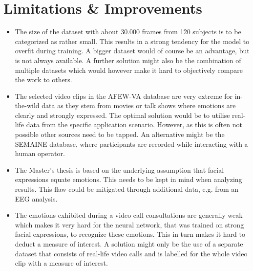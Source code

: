 \section{Limitations \& Improvements}
\begin{itemize}
    \item The size of the dataset with about 30.000 frames from 120 subjects is to be categorized as rather small. This results in a strong tendency for the model to overfit during training. A bigger dataset would of course be an advantage, but is not always available. A further solution might also be the combination of multiple datasets which would however make it hard to objectively compare the work to others.
    \item The selected video clips in the AFEW-VA database are very extreme for in-the-wild data as they stem from movies or talk shows where emotions are clearly and strongly expressed. The optimal solution would be to utilise real-life data from the specific application scenario. However, as this is often not possible other sources need to be tapped. An alternative might be the SEMAINE database, where participants are recorded while interacting with a human operator.
    \item The Master's thesis is based on the underlying assumption that facial expressions equate emotions. This needs to be kept in mind when analyzing results. This flaw could be mitigated through additional data, e.g. from an EEG analysis.
    \item The emotions exhibited during a video call consultations are generally weak which makes it very hard for the neural network, that was trained on strong facial expressions, to recognize these emotions. This in turn makes it hard to deduct a measure of interest. A solution might only be the use of a separate dataset that consists of real-life video calls and is labelled for the whole video clip with a measure of interest.
\end{itemize}


